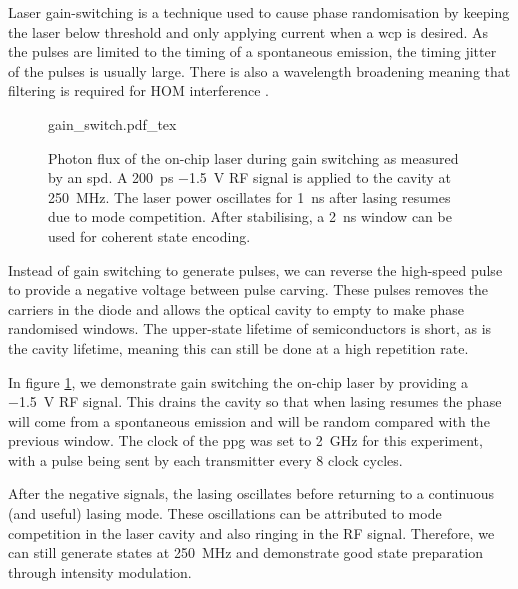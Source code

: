 
Laser gain-switching is a technique used to cause phase randomisation by keeping the laser below threshold and only applying current when a \ac{wcp} is desired. As the pulses are limited to the timing of a spontaneous emission, the timing jitter of the pulses is usually large. There is also a wavelength broadening meaning that filtering is required for \ac{HOM} interference \cite{Agnesi2019}. 

\begin{figure}[tp]
	\centering
	\def\svgwidth{0.8\textwidth} 
	{gain_switch.pdf_tex}
	\caption[Photon flux whilst gain switching of the on-chip lasers at \SI{250}{MHz}]{Photon flux of the on-chip laser during gain switching as measured by an \acs{spd}. A \SI{200}{ps} \SI{-1.5}{V} RF signal is applied to the cavity at \SI{250}{MHz}. The laser power oscillates for \SI{1}{ns} after lasing resumes due to mode competition. After stabilising, a \SI{2}{ns} window can be used for coherent state encoding.}	
	\label{fig:gain_switch}
\end{figure}

Instead of gain switching to generate pulses, we can reverse the high-speed pulse to provide a negative voltage between pulse carving. These pulses removes the carriers in the diode and allows the optical cavity to empty to make phase randomised windows. The upper-state lifetime of semiconductors is short, as is the cavity lifetime, meaning this can still be done at a high repetition rate. 

In figure \ref{fig:gain_switch}, we demonstrate gain switching the on-chip laser by providing a \SI{-1.5}{V} RF signal. This drains the cavity so that when lasing resumes the phase will come from a spontaneous emission and will be random compared with the previous window. The clock of the \ac{ppg} was set to \SI{2}{GHz} for this experiment, with a pulse being sent by each transmitter every 8 clock cycles. 

After the negative signals, the lasing oscillates before returning to a continuous (and useful) lasing mode. These oscillations can be attributed to mode competition in the laser cavity and also ringing in the RF signal. Therefore, we can still generate states at \SI{250}{MHz} and demonstrate good state preparation through intensity modulation.

